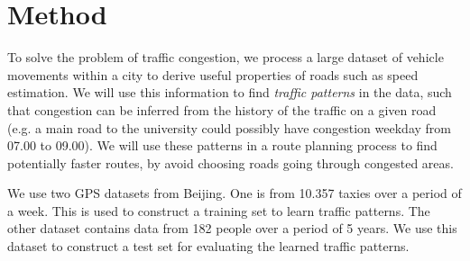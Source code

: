 \section{Method}
To solve the problem of traffic congestion, we process a large dataset of vehicle movements within a city to derive useful properties of roads such as speed estimation. We will use this information to find \emph{traffic patterns} in the data, such that congestion can be inferred from the history of the traffic on a given road (e.g. a main road to the university could possibly have congestion weekday from 07.00 to 09.00). We will use these patterns in a route planning process to find potentially faster routes, by avoid choosing roads going through congested areas.


We use two GPS datasets from Beijing. One is from 10.357 taxies over a period of a week\cite{Tdrive}. This is used to construct a training set to learn traffic patterns. The other dataset contains data from 182 people over a period of 5 years\cite{Geolife}. We use this dataset to construct a test set for evaluating the learned traffic patterns.






